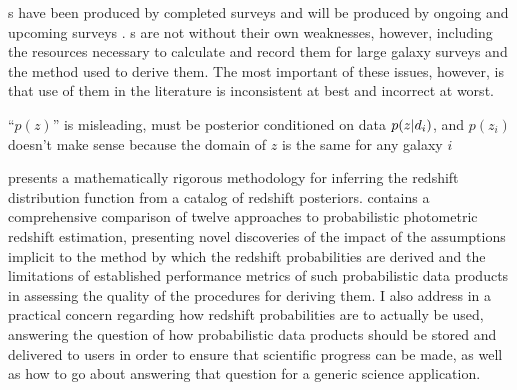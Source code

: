 \Pzpdf s have been produced by completed surveys \citep{Hildebrandt2012, Sheldon2012} and will be produced by ongoing and upcoming surveys \citep{LSSTScienceCollaboration2009, CarrascoKind2014a, Bonnett2015, Masters2015}.  
\Pzpdf s are not without their own weaknesses, however, including the resources necessary to calculate and record them for large galaxy surveys \citep{CarrascoKind2014} and the method used to derive them.  
The most important of these issues, however, is that use of them in the literature is inconsistent at best and incorrect at worst.  

``$p(z)$'' is misleading, must be posterior conditioned on data $p(z \vert d_{i})$, and $p(z_{i})$ doesn't make sense because the domain of $z$ is the same for any galaxy $i$

\clearpage


\clearpage


\clearpage


 presents a mathematically rigorous methodology for inferring the redshift distribution function from a catalog of redshift posteriors.
 contains a comprehensive comparison of twelve approaches to probabilistic photometric redshift estimation, presenting novel discoveries of the impact of the assumptions implicit to the method by which the redshift probabilities are derived and the limitations of established performance metrics of such probabilistic data products in assessing the quality of the procedures for deriving them.
I also address in  a practical concern regarding how redshift probabilities are to actually be used, answering the question of how probabilistic data products should be stored and delivered to users in order to ensure that scientific progress can be made, as well as how to go about answering that question for a generic science application.


